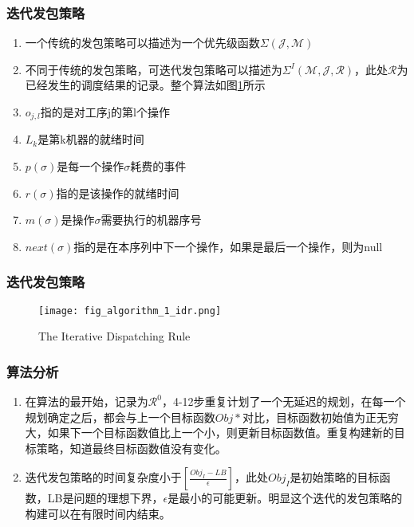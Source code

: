 \begin{frame}
    \frametitle{迭代发包策略}
    \begin{enumerate}
        \item 一个传统的发包策略可以描述为一个优先级函数$\Sigma(\mathcal{J,M})$
        \item 不同于传统的发包策略，可迭代发包策略可以描述为$\Sigma^I(\mathcal{M, J, R})$，此处$\mathcal{R}$为已经发生的调度结果的记录。整个算法如图\ref{fig:algorithm_idr}所示
        \item $o_{j,l}$指的是对工序j的第l个操作
        \item $L_k$是第k机器的就绪时间
        \item $p(\sigma)$是每一个操作$\sigma$耗费的事件\
        \item $r(\sigma)$指的是该操作的就绪时间
        \item $m(\sigma)$是操作$\sigma$需要执行的机器序号
        \item $next(\sigma)$指的是在本序列中下一个操作，如果是最后一个操作，则为null
    \end{enumerate}
\end{frame}

\begin{frame}
    \frametitle{迭代发包策略}
    \begin{figure}[H]
        \texttt{[image: fig\_algorithm\_1\_idr.png]}
        \caption{The Iterative Dispatching Rule}
        \label{fig:algorithm_idr}
    \end{figure}
\end{frame}

\begin{frame}
    \frametitle{算法分析}
    \begin{enumerate}
        \item 在算法的最开始，记录为$\mathcal{R^0}$，4-12步重复计划了一个无延迟的规划，在每一个规划确定之后，都会与上一个目标函数$Obj*$对比，目标函数初始值为正无穷大，如果下一个目标函数值比上一个小，则更新目标函数值。重复构建新的目标策略，知道最终目标函数值没有变化。

        \item 迭代发包策略的时间复杂度小于$\left[\frac{Obj_I-LB}{\epsilon}\right]$，此处$Obj_I$是初始策略的目标函数，LB是问题的理想下界，$\epsilon$是最小的可能更新。明显这个迭代的发包策略的构建可以在有限时间内结束。
    \end{enumerate}
\end{frame}